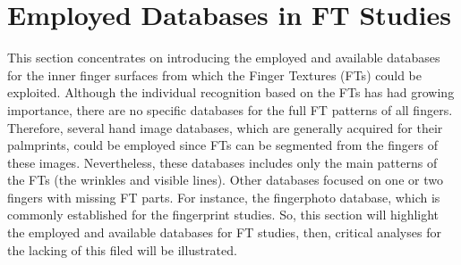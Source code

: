 \documentclass[review]{elsarticle}
\begin{document}

\section{Employed Databases in FT Studies} 
\label{Sec:databases}
	This section concentrates on introducing the employed and available databases for the inner finger surfaces from which the Finger Textures (FTs) could be exploited. Although the individual recognition based on the FTs has had growing importance, there are no specific databases for the full FT patterns of all fingers. Therefore, several hand image databases, which are generally acquired for their palmprints, could be employed since FTs can be segmented from the fingers of these images. Nevertheless, these databases includes only the main patterns of the FTs (the wrinkles and visible lines). Other databases focused on one or two fingers with missing FT parts. For instance, the fingerphoto database, which is commonly established for the fingerprint studies. So, this section will highlight the employed and available databases for FT studies, then, critical analyses for the lacking of this filed will be illustrated.
\end{document}

